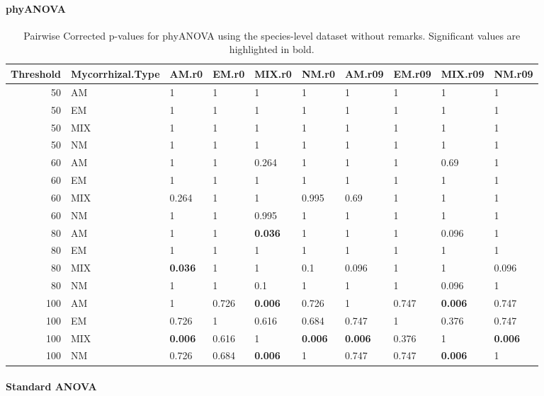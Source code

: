 \documentclass[]{article}
\let\oldparagraph\paragraph
\renewcommand{\paragraph}[1]{\oldparagraph{#1}\mbox{}}
\begin{document}
\hypertarget{phyanova-1}{%
\paragraph{phyANOVA}\label{phyanova-1}}

\begin{table}[H]

\caption{\label{tab:unnamed-chunk-6}Pairwise Corrected p-values for phyANOVA using the species-level dataset without remarks. Significant values are highlighted in bold.}
\centering
\begin{tabular}{r|l|l|l|l|l|l|l|l|l}
\hline
Threshold & Mycorrhizal.Type & AM.r0 & EM.r0 & MIX.r0 & NM.r0 & AM.r09 & EM.r09 & MIX.r09 & NM.r09\\
\hline
50 & AM & 1 & 1 & 1 & 1 & 1 & 1 & 1 & 1\\
\hline
50 & EM & 1 & 1 & 1 & 1 & 1 & 1 & 1 & 1\\
\hline
50 & MIX & 1 & 1 & 1 & 1 & 1 & 1 & 1 & 1\\
\hline
50 & NM & 1 & 1 & 1 & 1 & 1 & 1 & 1 & 1\\
\hline
60 & AM & 1 & 1 & 0.264 & 1 & 1 & 1 & 0.69 & 1\\
\hline
60 & EM & 1 & 1 & 1 & 1 & 1 & 1 & 1 & 1\\
\hline
60 & MIX & 0.264 & 1 & 1 & 0.995 & 0.69 & 1 & 1 & 1\\
\hline
60 & NM & 1 & 1 & 0.995 & 1 & 1 & 1 & 1 & 1\\
\hline
80 & AM & 1 & 1 & \textbf{0.036} & 1 & 1 & 1 & 0.096 & 1\\
\hline
80 & EM & 1 & 1 & 1 & 1 & 1 & 1 & 1 & 1\\
\hline
80 & MIX & \textbf{0.036} & 1 & 1 & 0.1 & 0.096 & 1 & 1 & 0.096\\
\hline
80 & NM & 1 & 1 & 0.1 & 1 & 1 & 1 & 0.096 & 1\\
\hline
100 & AM & 1 & 0.726 & \textbf{0.006} & 0.726 & 1 & 0.747 & \textbf{0.006} & 0.747\\
\hline
100 & EM & 0.726 & 1 & 0.616 & 0.684 & 0.747 & 1 & 0.376 & 0.747\\
\hline
100 & MIX & \textbf{0.006} & 0.616 & 1 & \textbf{0.006} & \textbf{0.006} & 0.376 & 1 & \textbf{0.006}\\
\hline
100 & NM & 0.726 & 0.684 & \textbf{0.006} & 1 & 0.747 & 0.747 & \textbf{0.006} & 1\\
\hline
\end{tabular}
\end{table}

\hypertarget{standard-anova-1}{%
\paragraph{Standard ANOVA}\label{standard-anova-1}}
\end{document}
